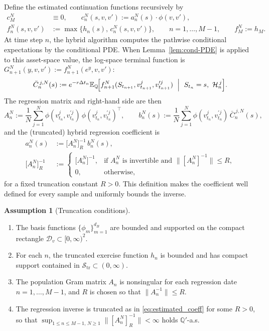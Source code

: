 \documentclass[10pt]{article}
\theoremstyle{plain}
\theoremstyle{definition}
\newtheorem{assumption}[theorem]{Assumption}
\theoremstyle{remark}
\begin{document}
Define the estimated continuation functions recursively by
\[
\begin{aligned}
c_M^N&\equiv 0,\qquad
c_n^N(s,v,v') := a_n^N(s)\cdot \phi(v,v'),\\
f_n^N(s,v,v')&:= \max\{h_n(s),\,c_n^N(s,v,v')\},
\qquad n=1,\dots,M-1,\qquad f_M^N := h_M.
\end{aligned}
\]
At time step $n$, the hybrid algorithm computes the pathwise conditional expectations by the conditional PDE.
When Lemma~\ref{lem:cond-PDE} is applied to this asset-space value, the log-space terminal function is
$G_{n+1}^{N}(y,v,v'):=f_{n+1}^N(e^y,v,v')$:
\[
\bar C_{n}^{\,j,N}(s)
:=
e^{-r\Delta t_n}
\mathbb{E}_{\mathbb{Q}}\!\Bigl[
f_{n+1}^N(S_{t_{n+1}}, v^j_{t_{n+1}}, v^{\prime j}_{t_{n+1}})
\ \Bigm|\ S_{t_n}=s,\ \mathcal H_n^{\,j}
\Bigr].
\]
The regression matrix and right-hand side are then
\[
A_n^N := \frac1N\sum_{j=1}^N \phi(v^j_{t_n},v^{\prime j}_{t_n})\,\phi(v^j_{t_n},v^{\prime j}_{t_n})^\top,
\qquad
b_n^N(s) := \frac1N\sum_{j=1}^N \phi(v^j_{t_n},v^{\prime j}_{t_n})\, \bar C_{n}^{\,j,N}(s),
\]
and the (truncated) hybrid regression coefficient is
\begin{equation}
\begin{aligned}
a_n^N(s)&:= \bigl[A_n^N\bigr]^{-1}_R\, b_n^N(s),\\
\bigl[A_n^N\bigr]^{-1}_R
&:=
\begin{cases}
\bigl[A_n^N\bigr]^{-1}, & \text{if } A_n^N \text{ is invertible and }\|[A_n^N]^{-1}\|\le R,\\
0, & \text{otherwise},
\end{cases}
\end{aligned}
\label{eq:estimated_coeff}
\end{equation}
for a fixed truncation constant $R>0$. This definition makes the
coefficient well defined for every sample and uniformly bounds the inverse.
\medskip


\begin{assumption}[Truncation conditions]
\label{ass:truncation}
\begin{enumerate}
\item The basis functions $\{\phi_m\}_{m=1}^{d_B}$ are bounded and supported on the compact rectangle
$\mathcal{D}_v\subset [0,\infty)^2$.
\item For each $n$, the truncated exercise function $h_n$ is bounded and has compact support contained in
$\mathcal S_{\mathrm{tr}}\subset(0,\infty)$.
\item The population Gram matrix $A_n$ is nonsingular for each regression date $n=1,\dots,M-1$, and $R$ is chosen so that
$\|A_n^{-1}\|\le R$.
\item The regression inverse is truncated as in \eqref{eq:estimated_coeff} for some $R>0$, so that
$\sup_{1\le n\le M-1,\,N\ge 1}\|[A_n^N]^{-1}_R\| <\infty$ holds $\mathbb{Q}'$-a.s.
\end{enumerate}
\end{assumption}
\end{document}
